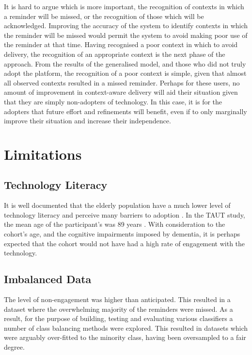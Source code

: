 It is hard to argue which is more important, the recognition of contexts in which a reminder will be missed, or the recognition of those which will be acknowledged. Improving the accuracy of the system to identify contexts in which the reminder will be missed would permit the system to avoid making poor use of the reminder at that time. Having recognised a poor context in which to avoid delivery, the recognition of an appropriate context is the next phase of the approach.
From the results of the generalised model, and those who did not truly adopt the platform, the recognition of a poor context is simple, given that almost all observed contexts resulted in a missed reminder.
Perhaps for these users, no amount of improvement in context-aware delivery will aid their situation given that they are simply non-adopters of technology. In this case, it is for the adopters that future effort and refinements will benefit, even if to only marginally improve their situation and increase their independence.

\section{Limitations}

\subsection{Technology Literacy}
It is well documented that the elderly population have a much lower level of technology literacy and perceive many barriers to adoption \cite{Cleland2014-IWAAL, Gilly1985, Renaud2008}. In the TAUT study, the mean age of the participant's was 89 years \cite{Cleland2014-IWAAL}. With consideration to the cohort's age, and the cognitive impairments imposed by dementia, it is perhaps expected that the cohort would not have had a high rate of engagement with the technology.

\subsection{Imbalanced Data}
The level of non-engagement was higher than anticipated. This resulted in a dataset where the overwhelming majority of the reminders were missed. As a result, for the purpose of building, testing and evaluating various classifiers a number of class balancing methods were explored. This resulted in datasets which were arguably over-fitted to the minority class, having been oversampled to a fair degree.

